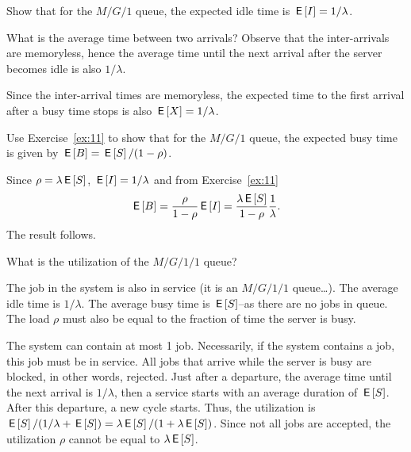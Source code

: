 \begin{exercise}[\faFlask]
  Show that for the $M/G/1$ queue, the expected idle time is
  $\,\mathsf{E}\left[I\right] = 1/\lambda$.  
  \begin{hint}
What is the average time between two
    arrivals? Observe that the inter-arrivals are memoryless, hence the
    average time until the next arrival after the server becomes idle
    is also $1/\lambda$.
  \end{hint}
  \begin{solution}
  Since the inter-arrival times are memoryless, the expected
      time to the first arrival after a busy time stops is also
      $\,\mathsf{E}\left[X\right]=1/\lambda$.
  \end{solution}
\end{exercise}

\begin{exercise}[\faFlask]
  Use Exercise~\ref{ex:11} to show that for the $M/G/1$ queue, the
  expected busy time is given by $\,\mathsf{E}\left[B\right] = \,\mathsf{E}\left[S\right]/(1-\rho)$.
  \begin{solution}
  Since $\rho = \lambda \,\mathsf{E}\left[S\right]$, $\,\mathsf{E}\left[I\right]= 1/\lambda$ and from Exercise~\ref{ex:11}
\begin{equation*}
  \,\mathsf{E}\left[B\right] = \frac{\rho }{1-\rho} \,\mathsf{E}\left[I\right] = \frac{\lambda \,\mathsf{E}\left[S\right]}{1-\rho} \frac1\lambda.
\end{equation*}
The result follows.
  \end{solution}
\end{exercise}

\begin{exercise}[\faFlask]
  What is the utilization of the $M/G/1/1$ queue?  
  \begin{hint}
The job in
    the system is also in service (it is an $M/G/1/1$ queue\ldots).
    The average idle time is $1/\lambda$. The average busy time is
    $\,\mathsf{E}\left[S\right]$--as there are no jobs in queue. The load $\rho$ must also
    be equal to the fraction of time the server is busy. 
  \end{hint}
  \begin{solution}
 The system can contain at most 1 job. Necessarily, if the
      system contains a job, this job must be in service.  All jobs
      that arrive while the server is busy are blocked, in other
      words, rejected.  Just after a departure, the average time until
      the next arrival is $1/\lambda$, then a service starts with an
      average duration of $\,\mathsf{E}\left[S\right]$. After this departure, a new cycle
      starts. Thus, the utilization is
      $\,\mathsf{E}\left[S\right]/(1/\lambda + \,\mathsf{E}\left[S\right]) = \lambda \,\mathsf{E}\left[S\right]/ (1 + \lambda \,\mathsf{E}\left[S\right])$.
      Since not all jobs are accepted, the utilization $\rho$ cannot
      be equal to $\lambda \,\mathsf{E}\left[S\right]$.
  \end{solution}
\end{exercise}

